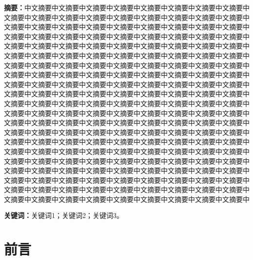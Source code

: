 





\textbf{摘要：}中文摘要中文摘要中文摘要中文摘要中文摘要中文摘要中文摘要中文摘要中文摘要中文摘要中文摘要中文摘要中文摘要中文摘要中文摘要中文摘要中文摘要中文摘要中文摘要中文摘要中文摘要中文摘要中文摘要中文摘要中文摘要中文摘要中文摘要中文摘要中文摘要中文摘要中文摘要中文摘要中文摘要中文摘要中文摘要中文摘要中文摘要中文摘要中文摘要中文摘要中文摘要中文摘要中文摘要中文摘要中文摘要中文摘要中文摘要中文摘要中文摘要中文摘要中文摘要中文摘要中文摘要中文摘要中文摘要中文摘要中文摘要中文摘要中文摘要中文摘要中文摘要中文摘要中文摘要中文摘要中文摘要中文摘要中文摘要中文摘要中文摘要中文摘要中文摘要中文摘要中文摘要中文摘要中文摘要中文摘要中文摘要中文摘要中文摘要中文摘要中文摘要中文摘要中文摘要中文摘要中文摘要中文摘要中文摘要中文摘要中文摘要中文摘要中文摘要中文摘要中文摘要中文摘要中文摘要中文摘要中文摘要中文摘要中文摘要中文摘要中文摘要中文摘要中文摘要中文摘要中文摘要中文摘要中文摘要中文摘要中文摘要中文摘要中文摘要中文摘要中文摘要中文摘要中文摘要中文摘要中文摘要中文摘要中文摘要中文摘要中文摘要中文摘要中文摘要中文摘要中文摘要中文摘要中文摘要中文摘要中文摘要中文摘要中文摘要中文摘要中文摘要中文摘要中文摘要中文摘要中文摘要中文摘要中文摘要中文摘要中文摘要中文摘要中文摘要中文摘要中文摘要中文摘要中文摘要中文摘要中文摘要中文摘要中文摘要中文摘要中文摘要中文摘要中文摘要中文摘要中文摘要中文摘要中文摘要中文摘要中文摘要中文摘要中文摘要中文摘要中文摘要中文摘要中文摘要中文摘要中文摘要中文摘要中文摘要中文摘要中文摘要中文摘要中文摘要中文摘要中文摘要中文摘要中文摘要中文摘要中文摘要中文摘要中文摘要中文摘要中文摘要中文摘要中文摘要中文摘要中

\textbf{关键词：}关键词1；关键词2；关键词3。


\setlength{\parindent}{2em} 
\section{前言}
\label{intro}

